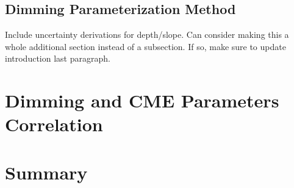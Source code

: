 \subsection{Dimming Parameterization Method}
Include uncertainty derivations for depth/slope. Can consider making this a whole additional section instead of a subsection. If so, make sure to update introduction last paragraph. 

\section{Dimming and CME Parameters Correlation}
\label{sec:correlation}

\section{Summary} 
\label{sec:chapter5summary}








